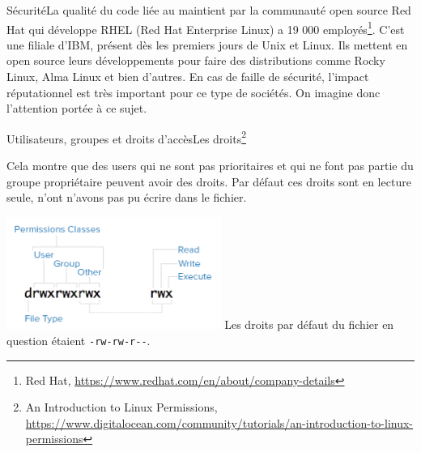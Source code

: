 \documentclass{beamer}
\begin{document}
    \begin{frame}{Sécurité}{La qualité du code liée au maintient par la communauté open source}
        Red Hat qui développe RHEL (Red Hat Enterprise Linux) a 19 000 employés\footnote{Red Hat, \url{https://www.redhat.com/en/about/company-details}}.
        \bigbreak
        C'est une filiale d'IBM, présent dès les premiers jours de Unix et Linux.
        \bigbreak
        Ils mettent en open source leurs développements pour faire des distributions comme Rocky Linux, Alma Linux et bien d'autres.
        \bigbreak
        En cas de faille de sécurité, l'impact réputationnel est très important pour ce type de sociétés.
        On imagine donc l'attention portée à ce sujet.
    \end{frame}

    \begin{frame}{Utilisateurs, groupes et droits d'accès}{Les droits\footnote{\label{rights-digitalocean}An Introduction to Linux Permissions, \url{https://www.digitalocean.com/community/tutorials/an-introduction-to-linux-permissions}}}
        \begin{dangercolorbox}
            Cela montre que des users qui ne sont pas prioritaires et qui ne font pas partie du groupe propriétaire peuvent avoir des droits.
            Par défaut ces droits sont en lecture seule, n'ont n'avons pas pu écrire dans le fichier.
        \end{dangercolorbox}
        \centering
        \includegraphics[width=7cm]{image/permission-classes}
        \flushleft
        Les droits par défaut du fichier en question étaient \lstinline{-rw-rw-r--}.
    \end{frame}
\end{document}
